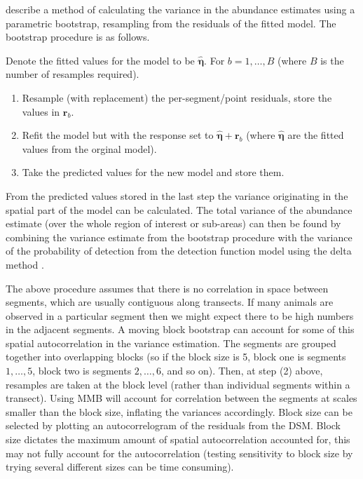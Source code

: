 \documentclass[a4paper,12pt]{article}
\begin{document}
\cite{Hedley:2004et} describe a method of calculating the variance in the abundance estimates using a parametric bootstrap, resampling from the residuals of the fitted model. The bootstrap procedure is as follows.

Denote the fitted values for the model to be $\hat{\bm{\eta}}$. For $b=1,\ldots,B$ (where $B$ is the number of resamples required).
\begin{enumerate}
	\item Resample (with replacement) the per-segment/point residuals, store the values in $\mathbf{r}_{b}$.
	\item Refit the model but with the response set to $\hat{\bm{\eta}}+\mathbf{r}_{b}$ (where $\hat{\bm{\eta}}$ are the fitted values from the orginal model).
	\item Take the predicted values for the new model and store them.
\end{enumerate}
From the predicted values stored in the last step the variance originating in the spatial part of the model can be calculated. The total variance of the abundance estimate (over the whole region of interest or sub-areas) can then be found by combining the variance estimate from the bootstrap procedure with the variance of the probability of detection from the detection function model using the delta method \citep[which assumes that the two components of the variance are independent;][]{verhoef:2012}.

The above procedure assumes that there is no correlation in space between segments, which are usually contiguous along transects. If many animals are observed in a particular segment then we might expect there to be high numbers in the adjacent segments. A moving block bootstrap \citep[MBB;][Section 8.6]{Efron:1993tv} can account for some of this spatial autocorrelation in the variance estimation. The segments are grouped together into overlapping blocks (so if the block size is 5, block one is segments $1,\ldots,5$, block two is segments $2,\ldots,6$, and so on). Then, at step (2) above, resamples are taken at the block level (rather than individual segments within a transect). Using MMB will account for correlation between the segments at scales smaller than the block size, inflating the variances accordingly. Block size can be selected by plotting an autocorrelogram of the residuals from the DSM. Block size dictates the maximum amount of spatial autocorrelation accounted for, this may not fully account for the autocorrelation (testing sensitivity to block size by trying several different sizes can be time consuming). 
\end{document}
